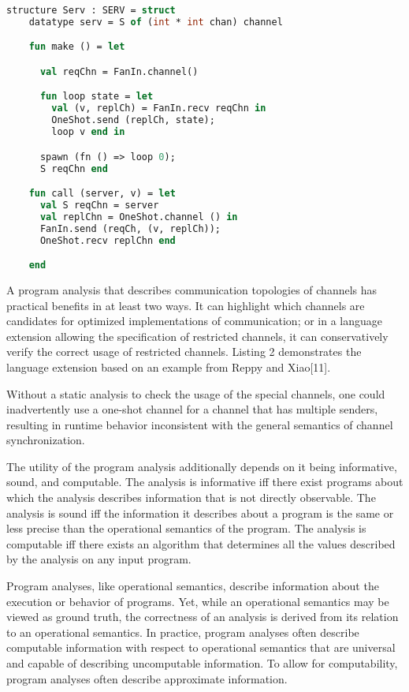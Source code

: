 \documentclass{article}
\begin{document}
\begin{lstlisting}[language=ML, style=codestyle1, escapechar=\%]
  structure Serv : SERV = struct 
    datatype serv = S of (int * int chan) channel 

    fun make () = let 

      val reqChn = FanIn.channel()

      fun loop state = let
        val (v, replCh) = FanIn.recv reqChn in 
        OneShot.send (replCh, state);
        loop v end in

      spawn (fn () => loop 0);
      S reqChn end 

    fun call (server, v) = let 
      val S reqChn = server
      val replChn = OneShot.channel () in 
      FanIn.send (reqCh, (v, replCh));
      OneShot.recv replChn end

    end
  \end{lstlisting}


A program analysis that describes communication topologies of channels has practical benefits
in at least two ways.  It can highlight which channels are candidates for optimized
implementations of communication; or in a language extension allowing the specification of
restricted channels, it can conservatively verify the correct usage of restricted channels.
Listing 2 demonstrates the language extension based on an example from Reppy and Xiao[11].


Without a static analysis to check the usage of the special channels, one could inadvertently
use a one-shot channel for a channel that has multiple senders, resulting in runtime behavior
inconsistent with the general semantics of channel synchronization.

The utility of the program analysis additionally depends on it being informative, sound, and
computable.  The analysis is informative iff there exist programs about which the analysis
describes information that is not directly observable.  The analysis is sound iff the
information it describes about a program is the same or less precise than the operational
semantics of the program. The analysis is computable iff there exists an algorithm that
determines all the values described by the analysis on any input program.

Program analyses, like operational semantics, describe information about the execution or
behavior of programs.  Yet, while an operational semantics may be viewed as ground truth, the
correctness of an analysis is derived from its relation to an operational semantics.  In
practice, program analyses often describe computable information with respect to operational
semantics that are universal and capable of describing uncomputable information.  To allow for
computability, program analyses often describe approximate information.
\end{document}
